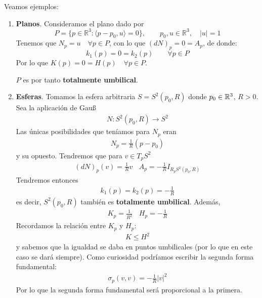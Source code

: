 \begin{ejemplo}
    Veamos ejemplos:
    \begin{enumerate}
        \item \textbf{Planos}. Consideramos el plano dado por
            \begin{equation*}
                P = \{p\in \mathbb{R}^3 : \langle p-p_0,u \rangle = 0\}, \qquad p_0,u\in \mathbb{R}^3, \quad |u| = 1
            \end{equation*}
            Tenemos que $N_p = u\quad \forall p\in P$, con lo que $(dN)_p = 0 = A_p$, de donde:
            \begin{equation*}
                k_1(p) = 0 = k_2(p) \qquad \forall p\in P
            \end{equation*}
            Por lo que $K(p) = 0 = H(p)\quad \forall p\in P$.

            $P$ es por tanto \textbf{totalmente umbilical}.


            \item \textbf{Esferas}. Tomamos la esfera arbitraria $S = S^2(p_0, R)$ donde $p_0\in \mathbb{R}^3$, $R>0$. Sea la aplicación de Gau\ss~ 
            \begin{gather*}
                N : S^2(p_0, R) \to S^2
            \end{gather*}
            Las únicas posibilidades que teníamos para $N_p$ eran
            \begin{gather*}
                N_p = \frac{1}{R}(p-p_0)
            \end{gather*}
            y su opuesto. Tendremos que para $v\in T_pS^2$
            \begin{gather*}
                (dN)_p(v) = \frac{1}{R}v \ \ \ \ A_p = - \frac{1}{R}I_{R_pS^2(p_0, R)}
            \end{gather*}
            Tendremos entonces
            \begin{gather*}
                k_1(p) = k_2(p) = - \frac{1}{R}
            \end{gather*}
            es decir, $S^2(p_0, R)$ también es \textbf{totalmente umbilical}. Además,
            \begin{gather*}
                K_p = \frac{1}{R^2}\ \ \ \ H_p = - \frac{1}{R}
            \end{gather*}
            Recordamos la relación entre $K_p$ y $H_p$:
            \begin{gather*}
                K \leq H^2
            \end{gather*}
            y sabemos que la igualdad se daba en puntos umbilicales (por lo que en este caso se dará siempre). Como curiosidad podríamos escribir la segunda forma fundamental:
            \begin{gather*}
                \sigma_p(v,v) = - \frac{1}{R}|v|^2
            \end{gather*}
            Por lo que la segunda forma fundamental será proporcional a la primera.


\end{enumerate}
\end{ejemplo}
